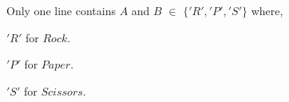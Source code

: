 Only one line contains $A$ and $B$ $\in$ $\{'R','P','S' \}$ where,

$'R'$ for $Rock$.

$'P'$ for $Paper$.

$'S'$ for $Scissors$.